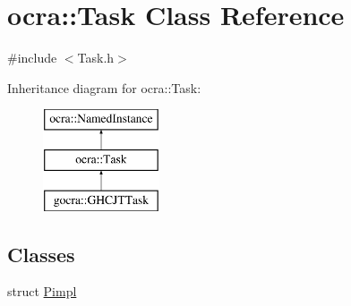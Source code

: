 \hypertarget{classocra_1_1Task}{}\section{ocra\+:\+:Task Class Reference}
\label{classocra_1_1Task}


{\ttfamily \#include $<$Task.\+h$>$}

Inheritance diagram for ocra\+:\+:Task\+:\begin{figure}[H]
\begin{center}
\leavevmode
\includegraphics[height=3.000000cm]{d9/d84/classocra_1_1Task}
\end{center}
\end{figure}
\subsection*{Classes}
\begin{DoxyCompactItemize}
\item 
struct \hyperlink{structocra_1_1Task_1_1Pimpl}{Pimpl}
\end{DoxyCompactItemize}
